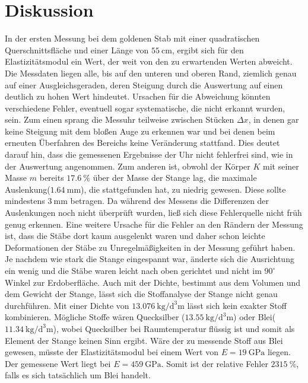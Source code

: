 \section{Diskussion}
\label{sec:Diskussion}

In der ersten Messung bei dem goldenen Stab mit einer quadratischen Querschnittsfläche und einer Länge von $\SI{55}{\centi\meter}$, ergibt sich für den Elastizitätsmodul ein Wert, der weit von den zu erwartenden Werten abweicht. Die Messdaten liegen alle, bis auf den unteren und oberen Rand, ziemlich genau auf einer Ausgleichsgeraden, deren Steigung durch die Auswertung auf einen deutlich zu hohen Wert hindeutet. Ursachen für die Abweichung könnten verschiedene Fehler, eventuell sogar systematische, die nicht erkannt wurden, sein. Zum einen sprang die Messuhr teilweise zwischen Stücken $ \Delta x$, in denen gar keine Steigung mit dem bloßen Auge zu erkennen war und bei denen beim erneuten Überfahren des Bereichs keine Veränderung stattfand. Dies deutet darauf hin, dass die gemessenen Ergebnisse der Uhr nicht fehlerfrei sind, wie in der Auswertung angenommen. 
Zum anderen ist, obwohl der Körper $K$ mit seiner Masse $m$ bereits $\SI{17.6}{\percent}$ über der Masse der Stange lag, die maximale Auslenkung($\SI{1.64}{\milli\meter}$), die stattgefunden hat, zu niedrig gewesen. Diese sollte mindestens $\SI{3}{\milli\meter}$ betragen. Da während des Messens die Differenzen der Auslenkungen noch nicht überprüft wurden, ließ sich diese Fehlerquelle nicht früh genug erkennen. 
Eine weitere Ursache für die Fehler an den Rändern der Messung ist, dass die Stäbe dort kaum ausgelenkt waren und daher schon leichte Deformationen der Stäbe zu Unregelmäßigkeiten in der Messung geführt haben. Je nachdem wie stark die Stange eingespannt war, änderte sich die Ausrichtung ein wenig und die Stäbe waren leicht nach oben gerichtet und nicht im $90^\circ$ Winkel zur Erdoberfläche.  
Auch mit der Dichte, bestimmt aus dem Volumen und dem Gewicht der Stange, lässt sich die Stoffanalyse der Stange nicht genau durchführen. Mit einer Dichte von $\SI{13,076}{\kilo\gram\per\cubic\deci\meter}$ lässt sich kein exakter Stoff kombinieren. Mögliche Stoffe wären Quecksilber ($\SI{13,55}{\kilo\gram\per\cubic\deci\meter}$) oder Blei($\SI{11,34}{\kilo\gram\per\cubic\deci\meter}$), wobei Quecksilber bei Raumtemperatur flüssig ist und somit als Element der Stange keinen Sinn ergibt. Wäre der zu messende Stoff aus Blei gewesen, müsste der Elastizitätsmodul bei einem Wert von $E =\SI{19}{\giga\pascal}$ liegen. Der gemessene Wert liegt bei $E =\SI{459}{\giga\pascal}$. Somit ist der relative Fehler $\SI{2315}{\percent}$, falls es sich tatsächlich um Blei handelt. 


